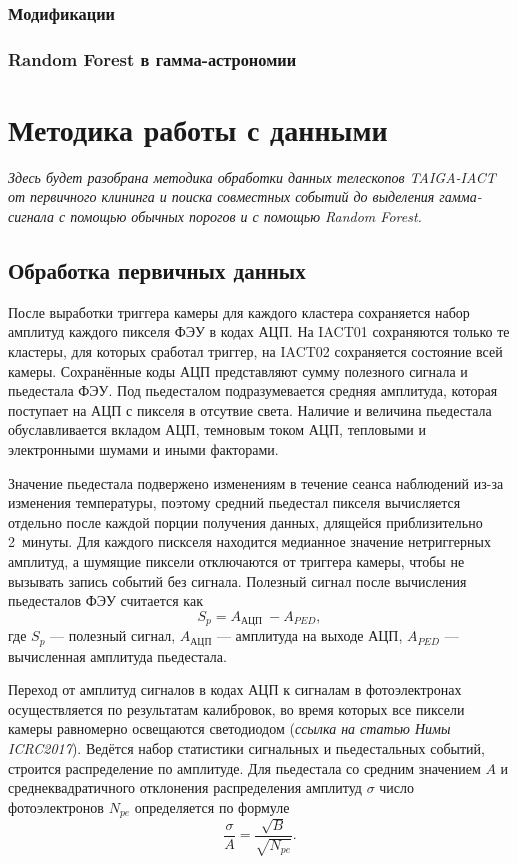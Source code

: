 \documentclass[magd,floatypics,numeref]{msudipl} %
\begin{document}
\subsection{Модификации}
\subsection{Random Forest в гамма-астрономии}

\chapter{Методика работы с данными}
\textit{Здесь будет разобрана методика обработки данных телескопов TAIGA-IACT от первичного клининга и поиска совместных событий до выделения гамма-сигнала с помощью обычных порогов и с помощью Random Forest.}
\section{Обработка первичных данных}
После выработки триггера камеры для каждого кластера сохраняется набор амплитуд каждого пикселя ФЭУ в кодах АЦП. На IACT01 сохраняются только те кластеры, для которых сработал триггер, на IACT02 сохраняется состояние всей камеры. Сохранённые коды АЦП представляют сумму полезного сигнала и пьедестала ФЭУ. Под пьедесталом подразумевается средняя амплитуда, которая поступает на АЦП с пикселя в отсутвие света. Наличие и величина пьедестала обуславливается вкладом АЦП, темновым током АЦП, тепловыми и электронными шумами и иными факторами. 

Значение пьедестала подвержено изменениям в течение сеанса наблюдений из-за изменения температуры, поэтому средний пьедестал пикселя вычисляется отдельно после каждой порции получения данных, длящейся приблизительно 2~минуты. Для каждого пискселя находится медианное значение нетриггерных амплитуд, а шумящие пиксели отключаются от триггера камеры, чтобы не вызывать запись событий без сигнала. Полезный сигнал после вычисления пьедесталов ФЭУ считается как
\begin{equation}
S_{p}=A_{\text {АЦП }}-A_{P E D},
\end{equation}
где $S_p$ --- полезный сигнал, $A_{\text{АЦП}}$ --- амплитуда на выходе АЦП, $A_{PED}$ --- вычисленная амплитуда пьедестала.

Переход от амплитуд сигналов в кодах АЦП к сигналам в фотоэлектронах осуществляется  по результатам калибровок, во время которых все пиксели камеры равномерно освещаются светодиодом (\textit{ссылка на статью Нимы ICRC2017}).  Ведётся набор статистики сигнальных и пьедестальных событий, строится распределение по амплитуде. Для пьедестала со средним значением $A$ и среднеквадратичного отклонения распределения амплитуд $\sigma$ число фотоэлектронов $N_{pe}$ определяется по формуле
\begin{equation}
\frac{\sigma}{A}=\frac{\sqrt{B}}{\sqrt{N_{p e}}}.
\end{equation}
\end{document}
